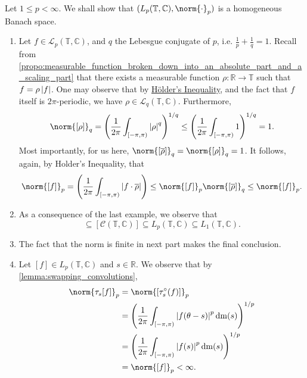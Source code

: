 \documentclass[notoc,notitlepage]{tufte-book}
\DeclareMathOperator{\Trig}{Trig}
\DeclareMathOperator{\dm}{dm}
\begin{document}
\begin{eg}\label{eg:biglp_of_2pi_periodic_fns_is_a_hom_ban_sp}
  Let $1 \leq p < \infty$. We shall show that
  $(L_p(\mathbb{T}, \mathbb{C}), \norm{\cdot}_p)$ is
  a homogeneous Banach space.
  \begin{enumerate}
    \item Let $f \in \mathcal{L}_p(\mathbb{T}, \mathbb{C})$,
      and $q$ the Lebesgue conjugate of $p$, i.e. $\frac{1}{p} + \frac{1}{q} = 1$.
      Recall from
      \cref{propo:measurable_function_broken_down_into_an_absolute_part_and_a_scaling_part}
      that there exists a measurable function $\rho : \mathbb{R} \to \mathbb{T}$
      such that $f = \rho \left|f\right|$. One may observe that by
      \hyperref[thm:holders_inequality_lp_spaces]{Hölder's Inequality},
      and the fact that $f$ itself is $2\pi$-periodic,
      we have $\rho \in \mathcal{L}_q(\mathbb{T}, \mathbb{C})$.
      Furthermore,
      \begin{equation*}
        \norm{[\rho]}_{q}
        = \left( \frac{1}{2\pi} \int_{[-\pi, \pi)} \abs{\rho}^q \right)^{1 / q}
        \leq \left( \frac{1}{2\pi} \int_{[-\pi, \pi)} 1 \right)^{1 / q} = 1.
      \end{equation*}
      Most importantly, for us here,
      $\norm{[\overline{\rho}]}_q = \norm{[\rho]}_q = 1$.
      It follows, again, by Holder's Inequality, that
      \begin{equation*}
        \norm{[f]}_p = \left( 
          \frac{1}{2\pi} \int_{[-\pi, \pi)} \abs{f \cdot \overline{\rho}}
        \right)
        \leq \norm{[f]}_p \norm{[\overline{\rho}]}_q \leq \norm{[f]}_p.
      \end{equation*}

    \item As a consequence of the last example, we observe that
      \begin{equation*}
        [\Trig(\mathbb{T}, \mathbb{C})] \subseteq [\mathcal{C}(\mathbb{T}, \mathbb{C})]
        \subseteq L_p(\mathbb{T}, \mathbb{C}) \subseteq L_1(\mathbb{T}, \mathbb{C}).
      \end{equation*}

    \item The fact that the norm is finite in
      next part makes the final conclusion.

    \item Let $[f] \in L_p(\mathbb{T}, \mathbb{C})$ and $s \in \mathbb{R}$.
      We observe that by \cref{lemma:swapping_convolutions},
      \begin{align*}
        \norm{\tau_s[f]}_p
        &= \norm{[\tau_s^{\circ}(f)]}_p \\
        &= \left( \frac{1}{2\pi} \int_{[-\pi, \pi)}
          \abs{f(\theta - s)}^p \dm(s) \right)^{1 / p} \\
        &= \left( \frac{1}{2\pi} \int_{[-\pi, \pi)}
          \abs{f(s)}^p \dm(s) \right)^{1 / p} \\
        &= \norm{[f]}_p < \infty.
      \end{align*}


\end{enumerate}
\end{eg}
\end{document}
